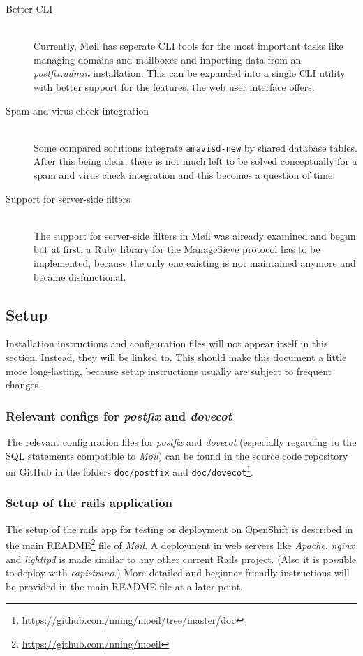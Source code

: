 \documentclass[12pt,a4paper]{scrartcl}
\begin{document}
			\begin{description}
				\item[\rm Better \ac{CLI}]\ \\
					Currently, Møil has seperate \ac{CLI} tools for the most
					important tasks like managing domains and mailboxes and
					importing data from an \emph{postfix.admin} installation.
					This can be expanded into a single \ac{CLI} utility with
					better support for the features, the web user interface
					offers.

				\item[\rm Spam and virus check integration]\ \\
					Some compared solutions integrate \texttt{amavisd-new} by
					shared database tables. After this being clear, there is
					not much left to be solved conceptually for a spam and
					virus check integration and this becomes a question of time.

				\item[\rm Support for server-side filters]\ \\
					The support for server-side filters in Møil was already
					examined and begun but at first, a Ruby library for the
					ManageSieve protocol has to be implemented, because the
					only one existing is not maintained anymore and became
					disfunctional.
			\end{description}

		\subsection{Setup}
			Installation instructions and configuration files will not appear
			itself in this section. Instead, they will be linked to. This
			should make this document a little more long-lasting, because setup
			instructions usually are subject to frequent changes.

			\subsubsection{Relevant configs for \emph{postfix} and \emph{dovecot}}
				The relevant configuration files for \emph{postfix} and
				\emph{dovecot} (especially regarding to the \ac{SQL} statements
				compatible to \emph{Møil}) can be found in the source code
				repository on GitHub in the folders \texttt{doc/postfix} and
				\texttt{doc/dovecot}\footnote{\url{https://github.com/nning/moeil/tree/master/doc}}.

			\subsubsection{Setup of the rails application}
				The setup of the rails app for testing or deployment on
				OpenShift is described in the main
				README\footnote{\url{https://github.com/nning/moeil}} file of
				\emph{Møil}. A deployment in web servers like \emph{Apache},
				\emph{nginx} and \emph{lighttpd} is made similar to any other
				current \ac{Rails} project. (Also it is possible to deploy with
				\emph{capistrano}.) More detailed and beginner-friendly
				instructions will be provided in the main README file at a
				later point.
\end{document}
